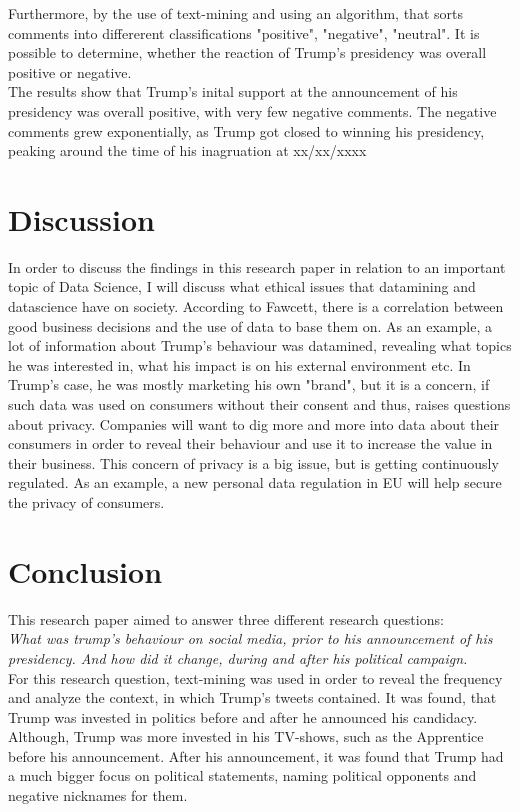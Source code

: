\documentclass[11pt]{article}
\begin{document}
Furthermore, by the use of text-mining and using an algorithm, that sorts comments into differerent classifications "positive", "negative", "neutral". It is possible to determine, whether the reaction of Trump's presidency was overall positive or negative. \\

The results show that Trump's inital support at the announcement of his presidency was overall positive, with very few negative comments.  The negative comments grew exponentially, as Trump got closed to winning his presidency, peaking around the time of his inagruation at xx/xx/xxxx


\section{Discussion}






In order to discuss the findings in this research paper in relation to an important topic of Data Science, I will discuss what ethical issues that datamining and datascience have on society. According to Fawcett, there is a correlation between good business decisions and the use of data to base them on. As an example, a lot of information about Trump's behaviour was datamined, revealing what topics he was interested in, what his impact is on his external environment etc. In Trump's case, he was mostly marketing his own "brand", but it is a concern, if such data was used on consumers without their consent and thus, raises questions about privacy. Companies will want to dig more and more into data about their consumers in order to reveal their behaviour and use it to increase the value in their business. This concern of privacy is a big issue, but is getting continuously regulated. As an example, a new personal data regulation in EU will help secure the privacy of consumers.

\section{Conclusion}
This research paper aimed to answer three different research questions: \\

\textit{What was trump's behaviour on social media, prior to his announcement of his presidency. And how did it change, during and after his political campaign.}\\

For this research question, text-mining was used in order to reveal the frequency and analyze the context, in which Trump's tweets contained. It was found, that Trump was invested in politics before and after he announced his candidacy. Although, Trump was more invested in his TV-shows, such as the Apprentice before his announcement. After his announcement, it was found that Trump had a much bigger focus on political statements, naming political opponents and negative nicknames for them. \\
\end{document}
